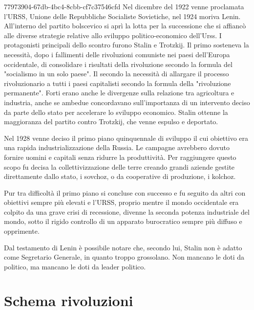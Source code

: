 \documentclass[preview]{standalone}
\begin{document}
\begin{snippet}{77973904-67db-4bc4-8cbb-cf7c37546cfd}
    Nel dicembre del 1922 venne proclamata l'URSS, Unione delle Repubbliche
    Socialiste Sovietiche, nel 1924 moriva Lenin. All'interno del partito bolscevico si aprì
    la lotta per la successione che si affiancò alle diverse strategie relative allo sviluppo
    politico-economico dell'Urss. I protagonisti principali dello scontro furono Stalin e
    Trotzkij. Il primo sosteneva la necessità, dopo i fallimenti delle rivoluzioni
    comuniste nei paesi dell'Europa occidentale, di consolidare i risultati della
    rivoluzione secondo la formula del "socialismo in un solo paese". Il secondo la
    necessità di allargare il processo rivoluzionario a tutti i paesi capitalisti secondo la
    formula della "rivoluzione permanente". Forti erano anche le divergenze sulla
    relazione tra agricoltura e industria, anche se ambedue concordavano
    sull'importanza di un intervento deciso da parte dello stato per accelerare lo
    sviluppo economico. Stalin ottenne la maggioranza del partito contro Trotzkij, che
    venne espulso e deportato.

    Nel 1928 venne deciso il primo piano quinquennale di sviluppo il cui obiettivo era
    una rapida industrializzazione della Russia. Le campagne avrebbero dovuto fornire
    uomini e capitali senza ridurre la produttività. Per raggiungere questo scopo fu
    decisa la collettivizzazione delle terre creando grandi aziende gestite direttamente
    dallo stato, i sovchoz, o da cooperative di produzione, i kolchoz.

    Pur tra difficoltà il primo piano si concluse con successo e fu seguito da altri con
    obiettivi sempre più elevati e l'URSS, proprio mentre il mondo occidentale era
    colpito da una grave crisi di recessione, divenne la seconda potenza industriale del
    mondo, sotto il rigido controllo di un apparato burocratico sempre più diffuso e
    opprimente.

    Dal testamento di Lenin è possibile notare che,
    secondo lui, Stalin non è adatto come Segretario Generale, in quanto troppo grossolano.
    Non mancano le doti da politico, ma mancano le doti da leader politico.
\end{snippet}


\section{Schema rivoluzioni}
\end{document}
